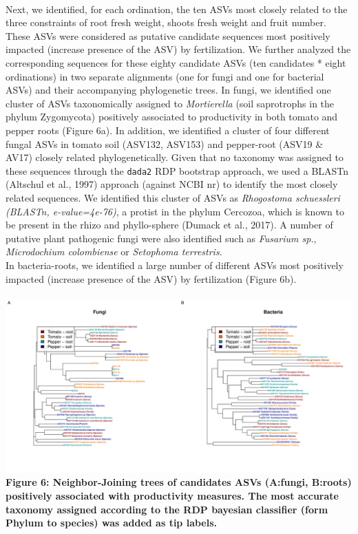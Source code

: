 \documentclass[11pt,]{article}
\begin{document}
\hspace*{0.333em}\\
Next, we identified, for each ordination, the ten ASVs most closely
related to the three constraints of root fresh weight, shoots fresh
weight and fruit number. These ASVs were considered as putative
candidate sequences most positively impacted (increase presence of the
ASV) by fertilization. We further analyzed the corresponding sequences
for these eighty candidate ASVs (ten candidates * eight ordinations) in
two separate alignments (one for fungi and one for bacterial ASVs) and
their accompanying phylogenetic trees. In fungi, we identified one
cluster of ASVs taxonomically assigned to \emph{Mortierella} (soil
saprotrophs in the phylum Zygomycota) positively associated to
productivity in both tomato and pepper roots (Figure 6a). In addition,
we identified a cluster of four different fungal ASVs in tomato soil
(ASV132, ASV153) and pepper-root (ASV19 \& AV17) closely related
phylogenetically. Given that no taxonomy was assigned to these sequences
through the \texttt{dada2} RDP bootstrap approach, we used a BLASTn
(Altschul et al., 1997) approach (against NCBI nr) to identify the most
closely related sequences. We identified this cluster of ASVs as
\emph{Rhogostoma schuessleri (BLASTn, e-value=4e-76)}, a protist in the
phylum Cercozoa, which is known to be present in the rhizo and
phyllo-sphere (Dumack et al., 2017). A number of putative plant
pathogenic fungi were also identified such as \emph{Fusarium sp.},
\emph{Microdochium colombiense} or \emph{Setophoma terrestris}. ~\\
In bacteria-roots, we identified a large number of different ASVs most
positively impacted (increase presence of the ASV) by fertilization
(Figure 6b). ~\\
\hspace*{0.333em}\\
\includegraphics{../figures/Figure7_candidateASVs.pdf}\\
\textbf{Figure 6: Neighbor-Joining trees of candidates ASVs (A:fungi,
B:roots) positively associated with productivity measures. The most
accurate taxonomy assigned according to the RDP bayesian classifier
(form Phylum to species) was added as tip labels.} ~\\
\hspace*{0.333em}
\end{document}
